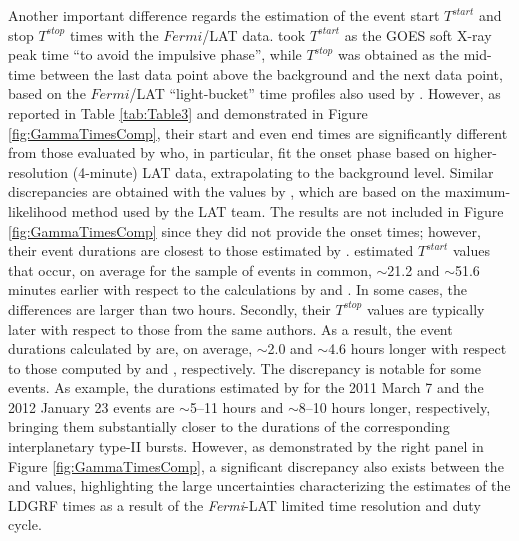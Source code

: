 \documentclass{aastex61}
\begin{document}
Another important difference regards the estimation of the event start $T^{start}$ and stop $T^{stop}$ times with the $Fermi$/LAT data.
\citet{ref:GOPALSWAMY2019b} took $T^{start}$ as the GOES soft X-ray peak time ``to avoid the impulsive phase'', while $T^{stop}$ was obtained as the mid-time between the last data point above the background and the next data point, based on the $Fermi$/LAT ``light-bucket'' time profiles also used by \citet{ref:SHARE2018}. 
However, as reported in Table \ref{tab:Table3} and demonstrated in Figure \ref{fig:GammaTimesComp}, their start and even end times are significantly different from those evaluated by \citet{ref:SHARE2018} who, in particular, fit the onset phase based on higher-resolution (4-minute) LAT data, extrapolating to the background level.
Similar discrepancies are obtained with the values by \citet{ref:WINTER2018}, which are based on the maximum-likelihood method used by the LAT team. The \citet{ref:AJELLO2021} results are not included in Figure \ref{fig:GammaTimesComp} since they did not provide the onset times; however, their event durations are closest to those estimated by \citet{ref:SHARE2018}.
\citet{ref:GOPALSWAMY2019b} estimated $T^{start}$ values that
occur, on average for the sample of events in common,
$\sim$21.2 and $\sim$51.6 minutes earlier with respect to the calculations by \citet{ref:SHARE2018} and \citet{ref:WINTER2018}.
In some cases, the differences are larger than two hours.
Secondly, their $T^{stop}$ values are typically later with respect to those from the same authors. As a result, the event durations calculated by \citet{ref:GOPALSWAMY2019b} are, on average, $\sim$2.0 and $\sim$4.6 hours longer with respect to those computed by \citet{ref:SHARE2018} and \citet{ref:WINTER2018}, respectively. 
The discrepancy is notable for some events.
As example, the durations estimated by \citet{ref:GOPALSWAMY2019b} for the 2011 March 7 and the 2012 January 23 events are $\sim$5--11 hours and $\sim$8--10 hours longer, respectively, bringing them substantially closer to the durations of the corresponding interplanetary type-II bursts. However, as demonstrated by the right panel in Figure \ref{fig:GammaTimesComp}, a significant discrepancy also exists between the \citet{ref:SHARE2018} and \citet{ref:WINTER2018} values, highlighting the large uncertainties characterizing the estimates of the LDGRF times as a result of the \textit{Fermi}-LAT limited time resolution and duty cycle.
\end{document}
